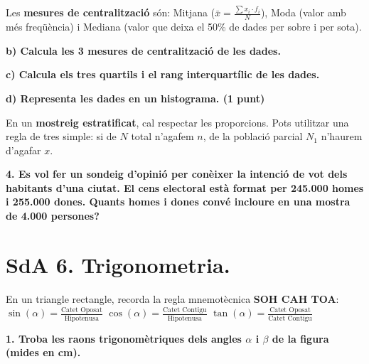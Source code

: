 \documentclass[12pt,a4paper]{article}
\begin{document}
\begin{capsula}
Les \textbf{mesures de centralització} són:
Mitjana ($\bar{x} = \frac{\sum x_i \cdot f_i}{N}$), Moda (valor amb més freqüència) i Mediana (valor que deixa el 50\% de dades per sobre i per sota).
\end{capsula}

\textbf{b) Calcula les 3 mesures de centralització de les dades.} \vspace{2cm}

\textbf{c) Calcula els tres quartils i el rang interquartílic de les dades.} \vspace{2cm}

\textbf{d) Representa les dades en un histograma. (1 punt)} \vspace{4cm}

\begin{capsula}
En un \textbf{mostreig estratificat}, cal respectar les proporcions. Pots utilitzar una regla de tres simple: si de $N$ total n'agafem $n$, de la població parcial $N_1$ n'haurem d'agafar $x$.
\end{capsula}

\textbf{4. Es vol fer un sondeig d’opinió per conèixer la intenció de vot dels habitants d’una ciutat. El cens electoral està format per 245.000 homes i 255.000 dones. Quants homes i dones convé incloure en una mostra de 4.000 persones?} \vspace{3cm}

\newpage
\section*{SdA 6. Trigonometria.}

\begin{capsula}
En un triangle rectangle, recorda la regla mnemotècnica \textbf{SOH CAH TOA}: \\
$\sin(\alpha) = \frac{\text{Catet Oposat}}{\text{Hipotenusa}}$ \hspace{0.5cm} 
$\cos(\alpha) = \frac{\text{Catet Contigu}}{\text{Hipotenusa}}$ \hspace{0.5cm} 
$\tan(\alpha) = \frac{\text{Catet Oposat}}{\text{Catet Contigu}}$
\end{capsula}

\textbf{1. Troba les raons trigonomètriques dels angles $\alpha$ i $\beta$ de la figura (mides en cm).}
\end{document}

